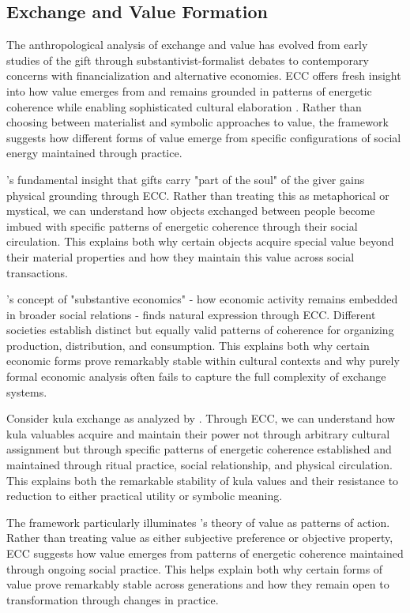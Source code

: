 \subsection{Exchange and Value Formation}

The anthropological analysis of exchange and value has evolved from early studies of the gift through substantivist-formalist debates to contemporary concerns with financialization and alternative economies. ECC offers fresh insight into how value emerges from and remains grounded in patterns of energetic coherence while enabling sophisticated cultural elaboration \cite{mauss1925gift}. Rather than choosing between materialist and symbolic approaches to value, the framework suggests how different forms of value emerge from specific configurations of social energy maintained through practice.

\cite{mauss1925gift}'s fundamental insight that gifts carry "part of the soul" of the giver gains physical grounding through ECC. Rather than treating this as metaphorical or mystical, we can understand how objects exchanged between people become imbued with specific patterns of energetic coherence through their social circulation. This explains both why certain objects acquire special value beyond their material properties and how they maintain this value across social transactions.

\cite{polanyi1944great}'s concept of "substantive economics" - how economic activity remains embedded in broader social relations - finds natural expression through ECC. Different societies establish distinct but equally valid patterns of coherence for organizing production, distribution, and consumption. This explains both why certain economic forms prove remarkably stable within cultural contexts and why purely formal economic analysis often fails to capture the full complexity of exchange systems.

Consider kula exchange as analyzed by \cite{malinowski1922argonauts}. Through ECC, we can understand how kula valuables acquire and maintain their power not through arbitrary cultural assignment but through specific patterns of energetic coherence established and maintained through ritual practice, social relationship, and physical circulation. This explains both the remarkable stability of kula values and their resistance to reduction to either practical utility or symbolic meaning.

The framework particularly illuminates \cite{graeber2001toward}'s theory of value as patterns of action. Rather than treating value as either subjective preference or objective property, ECC suggests how value emerges from patterns of energetic coherence maintained through ongoing social practice. This helps explain both why certain forms of value prove remarkably stable across generations and how they remain open to transformation through changes in practice.

